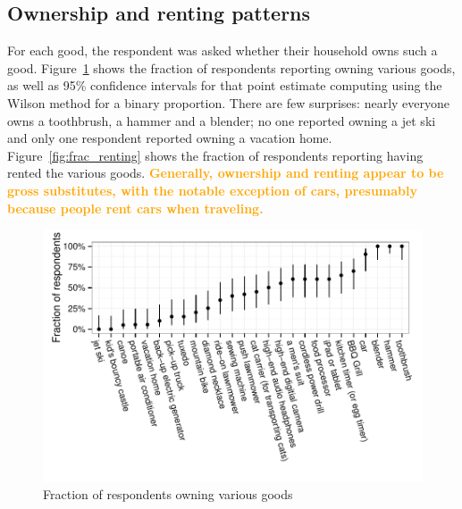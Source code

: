 \documentclass[11pt]{article}
\newcommand{\important}[1]{\textcolor{orange}{\textbf{#1}}}
\newcommand{\important}[1]{#1}
\begin{document}
\subsection{Ownership and renting patterns} 
For each good, the respondent was asked whether their household owns such a good. 
Figure~\ref{fig:frac_owning} shows the fraction of respondents reporting owning various goods, as well as 95\% confidence intervals for that point estimate computing using the Wilson method for a binary proportion.    
There are few surprises: nearly everyone owns a toothbrush, a hammer and a blender; no one reported owning a jet ski and only one respondent reported owning a vacation home.
Figure~\ref{fig:frac_renting} shows the fraction of respondents reporting having rented the various goods. 
\important{Generally, ownership and renting appear to be gross substitutes, with the notable exception of cars, presumably because people rent cars when traveling.}

\begin{figure}
\centering 
\caption{Fraction of respondents owning various goods \label{fig:frac_owning} }
\begin{minipage}{0.90 \linewidth}
\includegraphics[width = \linewidth]{./plots/ownership_fractions.pdf} 
\end{minipage} 
\end{figure} 
\end{document}
